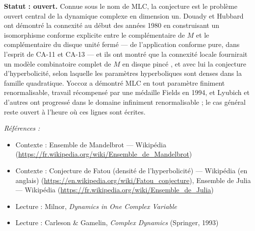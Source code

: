 \documentclass[11pt]{article}
\newenvironment{refs}{\par\small\noindent\emph{Références :}\begin{itemize}\setlength\itemsep{0pt}}{\end{itemize}\normalsize}
\begin{document}
\noindent \textbf{Statut : ouvert.} Connue sous le nom de MLC, la conjecture est le problème
ouvert central de la dynamique complexe en dimension un. Douady et Hubbard ont démontré la connexité
au début des années 1980 en construisant un isomorphisme conforme explicite entre le complémentaire
de $ M $ et le complémentaire du disque unité fermé --- de l'application conforme pure, dans
l'esprit de CA-11 et CA-13 --- et ils ont montré que la connexité locale fournirait un modèle
combinatoire complet de $ M $ en \og{} disque pincé \fg{}, et avec lui la conjecture d'hyperbolicité,
selon laquelle les paramètres hyperboliques sont denses dans la famille quadratique. Yoccoz a
démontré MLC en tout paramètre finiment renormalisable, travail récompensé par une médaille Fields
en 1994, et Lyubich et d'autres ont progressé dans le domaine infiniment renormalisable ; le cas
général reste ouvert à l'heure où ces lignes sont écrites.

\begin{refs}
\item Contexte : Ensemble de Mandelbrot --- Wikipédia (\url{https://fr.wikipedia.org/wiki/Ensemble_de_Mandelbrot})
\item Contexte : Conjecture de Fatou (densité de l'hyperbolicité) --- Wikipédia (en anglais) (\url{https://en.wikipedia.org/wiki/Fatou_conjecture}), Ensemble de Julia --- Wikipédia (\url{https://fr.wikipedia.org/wiki/Ensemble_de_Julia})
\item Lecture : Milnor, \textit{Dynamics in One Complex Variable}
\item Lecture : Carleson \& Gamelin, \textit{Complex Dynamics} (Springer, 1993)
\end{refs}

\bigskip
\end{document}
